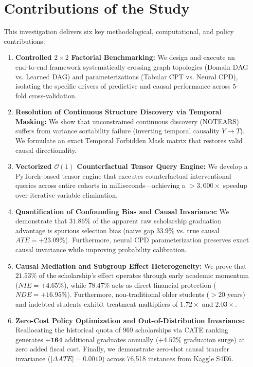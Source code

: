 \section{Contributions of the Study}

This investigation delivers six key methodological, computational, and policy contributions:

\begin{enumerate}
    \item \textbf{Controlled $2 \times 2$ Factorial Benchmarking:} We design and execute an end-to-end framework systematically crossing graph topologies (Domain DAG vs. Learned DAG) and parameterizations (Tabular CPT vs. Neural CPD), isolating the specific drivers of predictive and causal performance across 5-fold cross-validation.
    \item \textbf{Resolution of Continuous Structure Discovery via Temporal Masking:} We show that unconstrained continuous discovery (NOTEARS) suffers from variance sortability failure (inverting temporal causality $Y \to T$). We formulate an exact Temporal Forbidden Mask matrix that restores valid causal directionality.
    \item \textbf{Vectorized $\mathcal{O}(1)$ Counterfactual Tensor Query Engine:} We develop a PyTorch-based tensor engine that executes counterfactual interventional queries across entire cohorts in milliseconds---achieving a $>3,000\times$ speedup over iterative variable elimination.
    \item \textbf{Quantification of Confounding Bias and Causal Invariance:} We demonstrate that $31.86\%$ of the apparent raw scholarship graduation advantage is spurious selection bias (naive gap $33.9\%$ vs. true causal $ATE = +23.09\%$). Furthermore, neural CPD parameterization preserves exact causal invariance while improving probability calibration.
    \item \textbf{Causal Mediation and Subgroup Effect Heterogeneity:} We prove that $21.53\%$ of the scholarship's effect operates through early academic momentum ($NIE = +4.65\%$), while $78.47\%$ acts as direct financial protection ($NDE = +16.95\%$). Furthermore, non-traditional older students ($>20$ years) and indebted students exhibit treatment multipliers of $1.72\times$ and $2.03\times$.
    \item \textbf{Zero-Cost Policy Optimization and Out-of-Distribution Invariance:} Reallocating the historical quota of 969 scholarships via CATE ranking generates $\mathbf{+164}$ additional graduates annually ($+4.52\%$ graduation surge) at zero added fiscal cost. Finally, we demonstrate zero-shot causal transfer invariance ($|\Delta ATE| = 0.0010$) across 76,518 instances from Kaggle S4E6.
\end{enumerate}
